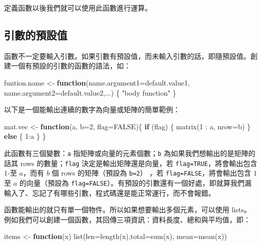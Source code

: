 \documentclass[
]{book}
\newenvironment{Shaded}{\begin{snugshade}}{\end{snugshade}}
\newcommand{\AttributeTok}[1]{\textcolor[rgb]{0.77,0.63,0.00}{#1}}
\newcommand{\ConstantTok}[1]{\textcolor[rgb]{0.00,0.00,0.00}{#1}}
\newcommand{\ControlFlowTok}[1]{\textcolor[rgb]{0.13,0.29,0.53}{\textbf{#1}}}
\newcommand{\DecValTok}[1]{\textcolor[rgb]{0.00,0.00,0.81}{#1}}
\newcommand{\FunctionTok}[1]{\textcolor[rgb]{0.00,0.00,0.00}{#1}}
\newcommand{\NormalTok}[1]{#1}
\newcommand{\OtherTok}[1]{\textcolor[rgb]{0.56,0.35,0.01}{#1}}
\newcommand{\SpecialCharTok}[1]{\textcolor[rgb]{0.00,0.00,0.00}{#1}}
\newcommand{\StringTok}[1]{\textcolor[rgb]{0.31,0.60,0.02}{#1}}
\theoremstyle{definition}
\theoremstyle{remark}
\begin{document}
定義函數以後我們就可以使用此函數進行運算。

\hypertarget{defaultargument}{%
\subsection{引數的預設值}\label{defaultargument}}

函數不一定要輸入引數。如果引數有預設值，而未輸入引數的話，即隨預設值。創建一個有預設的引數的函數的語法，如：

\begin{Shaded}
\begin{Highlighting}[]
\NormalTok{funtion.name }\OtherTok{\textless{}{-}} \ControlFlowTok{function}\NormalTok{(}\AttributeTok{name.argument1=}\NormalTok{default.value1, }
                         \AttributeTok{name.argument2=}\NormalTok{default.value2,...) \{}
  \StringTok{"body function"}
\NormalTok{\}}
\end{Highlighting}
\end{Shaded}

以下是一個能輸出連續的數字為向量或矩陣的簡單範例：

\begin{Shaded}
\begin{Highlighting}[]
\NormalTok{mat.vec }\OtherTok{\textless{}{-}} \ControlFlowTok{function}\NormalTok{(a, }\AttributeTok{b=}\DecValTok{2}\NormalTok{, }\AttributeTok{flag=}\ConstantTok{FALSE}\NormalTok{)\{ }
  \ControlFlowTok{if}\NormalTok{ (flag) \{}
    \FunctionTok{matrix}\NormalTok{(}\DecValTok{1} \SpecialCharTok{:}\NormalTok{ a, }\AttributeTok{nrow=}\NormalTok{b)}
\NormalTok{  \} }\ControlFlowTok{else}\NormalTok{ \{}
    \DecValTok{1}\SpecialCharTok{:}\NormalTok{a }
\NormalTok{  \}}
\NormalTok{\}}
\end{Highlighting}
\end{Shaded}

此函數有三個變數：\texttt{a} 指矩陣或向量的元素個數；\texttt{b} 為如果我們想輸出的是矩陣的話其 rows 的數量；\texttt{flag} 決定是輸出矩陣還是向量，若 \texttt{flag=TRUE}，將會輸出包含 \(1\)-至 \(a\)，而有 \(b\) 個 rows 的矩陣（預設為 \texttt{b=2}） ，若 \texttt{flag=FALSE}，將會輸出包含 \(1\) 至 \(a\) 的向量（預設為 \texttt{flag=FALSE}）。有預設的引數還有一個好處，即就算我們漏輸入了、忘記了有哪些引數，程式碼還是能正常運行，而不會報錯。

函數能輸出的就只有單一個物件。所以如果想要輸出多個元素，可以使用 lists。例如我們可以創建一個函數，其回傳三項資訊：資料長度、總和與平均值，即：

\begin{Shaded}
\begin{Highlighting}[]
\NormalTok{items }\OtherTok{\textless{}{-}} \ControlFlowTok{function}\NormalTok{(x) }\FunctionTok{list}\NormalTok{(}\AttributeTok{len=}\FunctionTok{length}\NormalTok{(x),}\AttributeTok{total=}\FunctionTok{sum}\NormalTok{(x), }\AttributeTok{mean=}\FunctionTok{mean}\NormalTok{(x))}
\end{Highlighting}
\end{Shaded}
\end{document}
